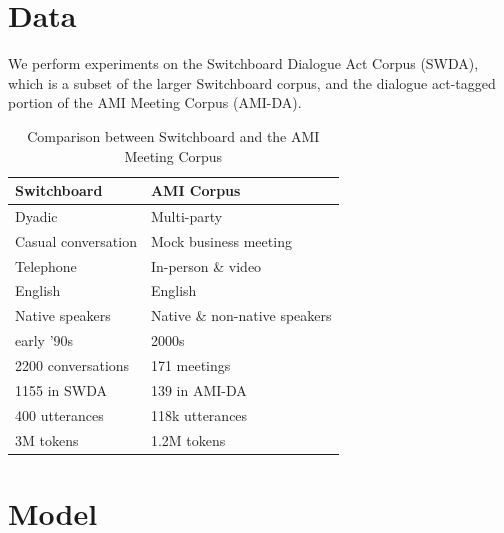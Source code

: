\documentclass[11pt,a4paper]{article}
\begin{document}
\section{Data}
We perform experiments on the Switchboard Dialogue Act Corpus (SWDA), which is a subset of the larger Switchboard corpus, and the dialogue act-tagged portion of the AMI Meeting Corpus (AMI-DA).


\begin{table}[]
\centering
\begin{tabular}{@{}ll@{}}
\toprule
\textbf{Switchboard}       & \textbf{AMI Corpus}                     \\ \midrule
Dyadic                     & Multi-party                             \\
Casual conversation        & Mock business meeting                   \\
Telephone                  & In-person \& video                      \\ \midrule
English                    & English                                 \\ 
Native speakers            & Native \& non-native speakers           \\ 
early '90s                 & 2000s                                   \\ \midrule
2200 conversations         & 171 meetings                            \\
  \hspace{1em} 1155 in SWDA               & \hspace{1em} 139 in AMI-DA                           \\
400 utterances             & 118k utterances                         \\
3M tokens                  & 1.2M tokens                             \\ \bottomrule
\end{tabular}
  \caption{Comparison between Switchboard and the AMI Meeting Corpus}
  \label{table:corpora}
\end{table}

  
\section{Model} %
\end{document}
